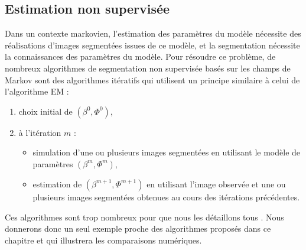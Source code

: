 \subsection{Estimation non supervis\'ee}

Dans un contexte markovien, l'estimation des param\`etres du
mod\`ele n\'ecessite des r\'ealisations d'images segment\'ees
issues de ce mod\`ele, et la segmentation n\'ecessite la
connaissances des param\`etres du mod\`ele. Pour r\'esoudre ce
probl\`eme, de nombreux
algorithmes de segmentation non supervis\'ee bas\'es
sur les champs de Markov sont des algorithmes it\'eratifs
qui utilisent un principe similaire \`a celui de 
l'algorithme EM :
\begin{enumerate}
\item choix initial de  $(\beta^0, \Phi^0)$,
\item \`a l'it\'eration $m$ : 
\begin{itemize}
\item
simulation d'une ou plusieurs images segment\'ees en utilisant
le  mod\`ele de param\`etres $(\beta^{m}, \Phi^{m})$,
\item estimation de $(\beta^{m+1}, \Phi^{m+1})$ en utilisant l'image
observ\'ee et une ou plusieurs images segment\'ees obtenues au
cours des it\'erations pr\'ec\'edentes.
\end{itemize}
\end{enumerate} 

Ces algorithmes
sont trop nombreux pour que nous les d\'etaillons tous 
\cite{Chalmond1989,Besag1986,Geman1984,Derin1989,Pieczinsky1994}.
Nous donnerons donc un seul exemple proche des algorithmes
propos\'es dans ce chapitre et qui illustrera les comparaisons num\'eriques.

